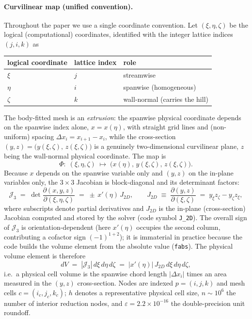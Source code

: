 \documentclass[11pt]{article}
\theoremstyle{definition}
\theoremstyle{remark}
\begin{document}
\paragraph{Curvilinear map (unified convention).}
Throughout the paper we use a single coordinate convention. Let
$(\xi,\eta,\zeta)$ be the logical (computational) coordinates, identified with
the integer lattice indices $(j,i,k)$ as
\begin{center}
\begin{tabular}{@{}lll@{}}
\toprule
logical coordinate & lattice index & role \\
\midrule
$\xi$ & $j$ & streamwise \\
$\eta$ & $i$ & spanwise (homogeneous) \\
$\zeta$ & $k$ & wall-normal (carries the hill) \\
\bottomrule
\end{tabular}
\end{center}
The body-fitted mesh is an \emph{extrusion}: the spanwise physical coordinate
depends on the spanwise index alone, $x=x(\eta)$, with straight grid lines and
(non-uniform) spacing $\Delta x_i=x_{i+1}-x_i$, while the cross-section
$(y,z)=\bigl(y(\xi,\zeta),\,z(\xi,\zeta)\bigr)$ is a genuinely two-dimensional
curvilinear plane, $z$ being the wall-normal physical coordinate. The map is
\begin{equation}
\Phi:\;(\xi,\eta,\zeta)\;\longmapsto\;\bigl(x(\eta),\,y(\xi,\zeta),\,z(\xi,\zeta)\bigr).
\label{eq:map}
\end{equation}
Because $x$ depends on the spanwise variable only and $(y,z)$ on the in-plane
variables only, the $3\times3$ Jacobian is block-diagonal and its determinant
factors:
\begin{equation}
\mathcal{J}_{3}
\;=\;\det\frac{\partial(x,y,z)}{\partial(\xi,\eta,\zeta)}
\;=\;\pm\,x'(\eta)\,J_{2D},
\qquad
J_{2D}\;\equiv\;\frac{\partial(y,z)}{\partial(\xi,\zeta)}
\;=\;y_{\xi}z_{\zeta}-y_{\zeta}z_{\xi},
\label{eq:jacobian-block}
\end{equation}
where subscripts denote partial derivatives and $J_{2D}$ is the in-plane
(cross-section) Jacobian computed and stored by the solver (code symbol
\texttt{J\_2D}). The overall sign of $\mathcal{J}_3$ is orientation-dependent
(here $x'(\eta)$ occupies the second column, contributing a cofactor sign
$(-1)^{1+2}$); it is immaterial in practice because the code builds the volume
element from the absolute value (\texttt{fabs}). The physical volume element is
therefore
\begin{equation}
dV \;=\; |\mathcal{J}_{3}|\,d\xi\,d\eta\,d\zeta
      \;=\; |x'(\eta)|\,J_{2D}\,d\xi\,d\eta\,d\zeta ,
\label{eq:dV}
\end{equation}
i.e.\ a physical cell volume is the spanwise chord length $|\Delta x_i|$ times an
area measured in the $(y,z)$ cross-section. Nodes are indexed $p=(i,j,k)$ and
mesh cells $c=(i_c,j_c,k_c)$; $h$ denotes a representative physical cell size,
$n\sim10^6$ the number of interior reduction nodes, and
$\varepsilon=2.2\times10^{-16}$ the double-precision unit roundoff.
\end{document}
